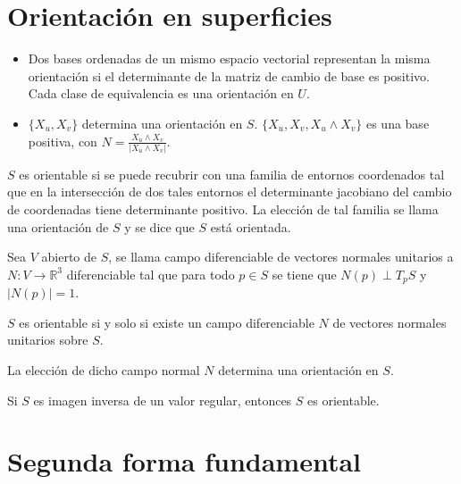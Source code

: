 \section{Orientación en superficies}

\begin{properties}
    \hfill
    \begin{itemize}
        \item Dos bases ordenadas de un mismo espacio vectorial representan la misma orientación si el determinante de la matriz de cambio de base es positivo.
              Cada clase de equivalencia es una orientación en $U$.
        \item $\{X_u, X_v\}$ determina una orientación en $S$.
              $\{X_u, X_v, X_u \land X_v\}$ es una base positiva, con $N = \frac{X_u \land X_v}{|X_u \land X_v|}$.
    \end{itemize}
\end{properties}

\begin{definition}
    $S$ es orientable si se puede recubrir con una familia de entornos coordenados tal que en la intersección de dos tales entornos el determinante jacobiano del cambio de coordenadas tiene determinante positivo.
    La elección de tal familia se llama una orientación de $S$ y se dice que $S$ está orientada.
\end{definition}

\begin{definition}
    Sea $V$ abierto de $S$, se llama campo diferenciable de vectores normales unitarios a $N : V \to \mathbb{R}^3$ diferenciable tal que para todo $p \in S$ se tiene que $N(p) \perp T_pS$ y $|N(p)| = 1$.
\end{definition}

\begin{theorem}
    $S$ es orientable si y solo si existe un campo diferenciable $N$ de vectores normales unitarios sobre $S$.
\end{theorem}

\begin{note}
    La elección de dicho campo normal $N$ determina una orientación en $S$.
\end{note}

\begin{proposition}
    Si $S$ es imagen inversa de un valor regular, entonces $S$ es orientable.
\end{proposition}

\section{Segunda forma fundamental}

